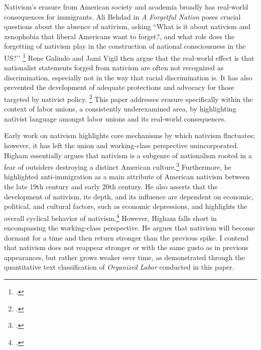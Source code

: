 \documentclass[12pt,a4paper]{article}
\begin{document}
Nativism's erasure from American society and academia broadly has real-world consequences for immigrants. Ali Behdad in \textit{A Forgetful Nation} poses crucial questions about the absence of nativism, asking ``What is it about nativism and xenophobia that liberal Americans want to forget?, and what role does the forgetting of nativism play in the construction of national consciousness in the US?’’ \footcite{behdad_forgetful_2005} Rene Galindo and Jami Vigil then argue that the real-world effect is that nationalist statements forged from nativism are often not recognized as discrimination, especially not in the way that racial discrimination is. It has also prevented the development of adequate protections and advocacy for those targeted by nativist policy. \footcite{galindo_are_2006} This paper addresses erasure specifically within the context of labor unions, a consistently underexamined area, by highlighting nativist language amongst labor unions and its real-world consequences.

Early work on nativism highlights core mechanisms by which nativism fluctuates; however, it has left the union and working-class perspective unincorporated. Higham essentially argues that nativism is a subgenre of nationalism rooted in a fear of outsiders destroying a distinct American culture.\footcite[5]{higham_strangers_1955} Furthermore, he highlighted anti-immigration as a main attribute of American nativism between the late 19th century and early 20th century. He also asserts that the development of nativism, its depth, and its influence are dependent on economic, political, and cultural factors, such as economic depressions, and highlights the overall cyclical behavior of nativism.\footcite{higham_strangers_1955} However, Higham falls short in encompassing the working-class perspective. He argues that nativism will become dormant for a time and then return stronger than the previous spike. I contend that nativism does not reappear stronger or with the same gusto as in previous appearances, but rather grows weaker over time, as demonstrated through the quantitative text classification of \textit{Organized Labor} conducted in this paper.
\end{document}
